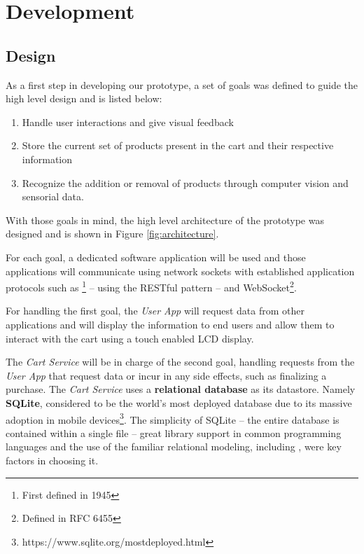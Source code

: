 \documentclass[openright]{normas-utf-tex} %
\begin{document}
\chapter{Development}
\label{chap:desenv}

\section{Design}
\label{sec:design}

As a first step in developing our prototype, a set of
goals was defined to guide the high level design and is listed below:

\begin{enumerate}
    \item Handle user interactions and give visual feedback
    \item Store the current set of products present in the cart and their respective information
    \item Recognize the addition or removal of products through computer vision and sensorial data.
\end{enumerate}

With those goals in mind, the high level architecture of the prototype
was designed and is shown in Figure \ref{fig:architecture}.

For each goal, a dedicated software application will be used and those
applications will communicate using 
network sockets \cite{Kurose2013} with established application protocols such as
\footnote{First defined in
 1945} -- using the RESTful pattern -- and
WebSocket\footnote{Defined in RFC 6455}.

For handling the first goal, the \textit{User App} will request data
from other applications and will display the information to end users and allow
them to interact with the cart using a touch enabled LCD display.

The \textit{Cart Service} will be in charge of the second goal,
handling requests from the \textit{User App} that request data or incur in any
side effects, such as finalizing a purchase. The \textit{Cart Service} uses a
\textbf{relational database} \cite{Silberschatz2010} as its datastore. Namely
\textbf{SQLite}, considered to be the world's most deployed database due to its
massive adoption in mobile
devices\footnote{https://www.sqlite.org/mostdeployed.html}. The simplicity of
SQLite -- the entire database is contained within a single file -- great
library support in common programming languages and the use of the familiar
relational modeling, including 
\cite{Nield2016}, were key factors in choosing it.
\end{document}

